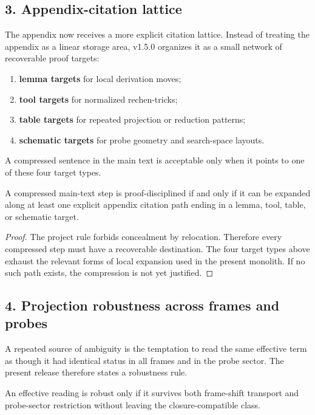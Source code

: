 \subsection*{3. Appendix-citation lattice}
The appendix now receives a more explicit citation lattice. Instead of treating
the appendix as a linear storage area, v1.5.0 organizes it as a small
network of recoverable proof targets:
\begin{enumerate}[leftmargin=2em]
  \item \textbf{lemma targets} for local derivation moves;
  \item \textbf{tool targets} for normalized rechen-tricks;
  \item \textbf{table targets} for repeated projection or reduction patterns;
  \item \textbf{schematic targets} for probe geometry and search-space layouts.
\end{enumerate}
A compressed sentence in the main text is acceptable only when it points to one
of these four target types.

\begin{lemma}
\label{lem:appendix-citation-lattice-lemma}
A compressed main-text step is proof-disciplined if and only if it can be
expanded along at least one explicit appendix citation path ending in a lemma,
tool, table, or schematic target.
\end{lemma}

\begin{proof}
The project rule forbids concealment by relocation. Therefore every compressed
step must have a recoverable destination. The four target types above exhaust
the relevant forms of local expansion used in the present monolith. If no such
path exists, the compression is not yet justified.
\end{proof}

\subsection*{4. Projection robustness across frames and probes}
A repeated source of ambiguity is the temptation to read the same effective term
as though it had identical status in all frames and in the probe sector. The
present release therefore states a robustness rule.

\begin{proposition}
\label{prop:projection-robustness}
An effective reading is robust only if it survives both frame-shift transport and
probe-sector restriction without leaving the closure-compatible class.
\end{proposition}

